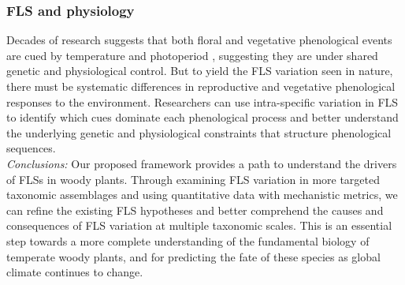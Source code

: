 \documentclass{article}
\begin{document}
\subsubsection*{FLS and physiology} 
Decades of research suggests that both floral and vegetative phenological events are cued by temperature and photoperiod \citep{Forrest2010, Flynn2018}, suggesting they are under shared genetic and physiological control. But to yield the FLS variation seen in nature, there must be systematic differences in reproductive and vegetative phenological responses to the environment. Researchers can use intra-specific variation in FLS to identify which cues dominate each phenological process and better understand the underlying genetic and physiological constraints that structure phenological sequences.\\

\emph{Conclusions:} Our proposed framework provides a path to understand the drivers of FLSs in woody plants. Through examining FLS variation in more targeted taxonomic assemblages and using quantitative data with mechanistic metrics, we can refine the existing FLS hypotheses and better comprehend the causes and consequences of FLS variation at multiple taxonomic scales. This is an essential step towards a more complete understanding of the fundamental biology of temperate woody plants, and for predicting the fate of these species as global climate continues to change.
\end{document}
